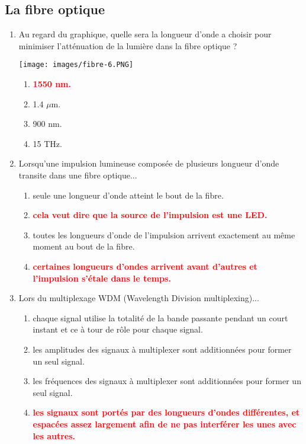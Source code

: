 \documentclass[a4paper]{article}
\begin{document}
\subsection{La fibre optique}





\begin{enumerate}[label=Q\arabic*.]


\item Au regard du graphique, quelle sera la longueur d'onde a choisir pour minimiser l'atténuation de la lumière dans la fibre optique ?
\begin{center}
    \texttt{[image: images/fibre-6.PNG]}
\end{center}
\begin{enumerate}
    \item \textcolor{red}{\textbf{1550 nm.}}
    \item 1.4 $ \mu $m.
    \item 900 nm.
    \item 15 THz.
\end{enumerate}


\item Lorsqu'une impulsion lumineuse composée de plusieurs longueur d'onde transite dans une fibre optique...
\begin{enumerate}
    \item seule une longueur d'onde atteint le bout de la fibre.
    \item \textcolor{red}{\textbf{cela veut dire que la source de l’impulsion est une LED.}}
    \item toutes les longueurs d'onde de l’impulsion arrivent exactement au même moment au bout de la fibre.
    \item \textcolor{red}{\textbf{certaines longueurs d'ondes arrivent avant d'autres et l’impulsion s’étale dans le temps.}}
\end{enumerate}


\item Lors du multiplexage WDM (Wavelength Division multiplexing)...
\begin{enumerate}
    \item chaque signal utilise la totalité de la bande passante pendant un court instant et ce à tour de rôle pour chaque signal.
    \item les amplitudes des signaux à multiplexer sont additionnées pour former un seul signal.
    \item les fréquences des signaux à multiplexer sont additionnées pour former un seul signal.
    \item \textcolor{red}{\textbf{les signaux sont portés par des longueurs d'ondes différentes, et espacées assez largement afin de ne pas interférer les unes avec les autres.}}
\end{enumerate}



\end{enumerate}
\end{document}
